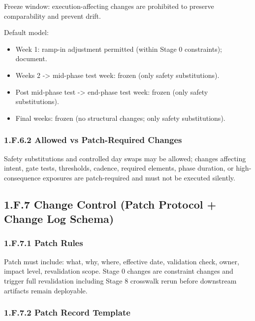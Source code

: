 \documentclass[10pt]{article}
\begin{document}
Freeze window: execution-affecting changes are prohibited to preserve comparability and prevent drift.

Default model:

\begin{itemize}
\item Week 1: ramp-in adjustment permitted (within Stage 0 constraints); document.
\item Weeks 2 -> mid-phase test week: frozen (only safety substitutions).
\item Post mid-phase test -> end-phase test week: frozen (only safety substitutions).
\item Final weeks: frozen (no structural changes; only safety substitutions).
\end{itemize}

\subsubsection*{1.F.6.2 Allowed vs Patch-Required Changes}

Safety substitutions and controlled day swaps may be allowed; changes affecting intent, gate tests, thresholds, cadence, required elements, phase duration, or high-consequence exposures are patch-required and must not be executed silently.

\subsection*{1.F.7 Change Control (Patch Protocol + Change Log Schema)}
{}

\subsubsection*{1.F.7.1 Patch Rules}

Patch must include: what, why, where, effective date, validation check, owner, impact level, revalidation scope.
Stage 0 changes are constraint changes and trigger full revalidation including Stage 8 crosswalk rerun before downstream artifacts remain deployable.

\subsubsection*{1.F.7.2 Patch Record Template}

\begingroup
\scriptsize
\setlength{\tabcolsep}{2pt}
\renewcommand{\arraystretch}{1.12}
\end{document}
